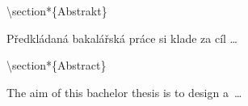 \textbackslash section*\{Abstrakt\}

Předkládaná bakalářská práce si klade za cíl \ldots{}

\textbackslash section*\{Abstract\}

The aim of this bachelor thesis is to design a~\ldots{}
